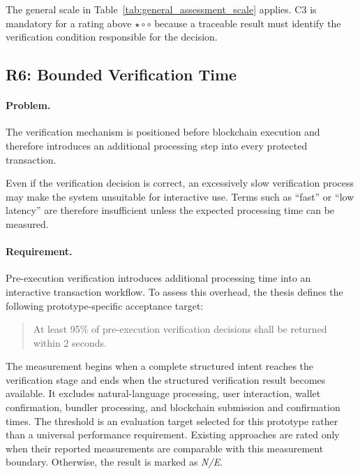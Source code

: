 The general scale in Table~\ref{tab:general_assessment_scale} applies.
C3 is mandatory for a rating above $\star\circ\circ$ because a traceable
result must identify the verification condition responsible for the decision.

\subsection{R6: Bounded Verification Time}
\label{subsec:r6_latency}

\paragraph{Problem.}

The verification mechanism is positioned before blockchain execution and
therefore introduces an additional processing step into every protected
transaction.

Even if the verification decision is correct, an excessively slow verification
process may make the system unsuitable for interactive use. Terms such as
``fast'' or ``low latency'' are therefore insufficient unless the expected
processing time can be measured.

\paragraph{Requirement.}

Pre-execution verification introduces additional processing
time into an interactive transaction workflow. To assess
this overhead, the thesis defines the following
prototype-specific acceptance target:

\begin{quote}
At least 95\% of pre-execution verification decisions
shall be returned within 2 seconds.
\end{quote}

The measurement begins when a complete structured intent
reaches the verification stage and ends when the structured
verification result becomes available. It excludes
natural-language processing, user interaction, wallet
confirmation, bundler processing, and blockchain submission
and confirmation times. The threshold is an evaluation target selected for this
prototype rather than a universal performance requirement.
Existing approaches are rated only when their reported
measurements are comparable with this measurement boundary.
Otherwise, the result is marked as \textit{N/E}.


